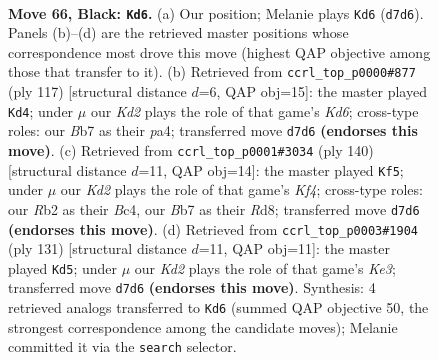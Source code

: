 \documentclass[11pt]{article}
\begin{document}
\clearpage

\begin{figure}[p]\centering
\begin{subfigure}{0.46\textwidth}\centering
\resizebox{\linewidth}{!}{%
\newchessgame
\chessboard[
  setfen={6R1/1b1k4/8/8/RP6/8/1r6/6K1 b - - 6 66},
  showmover=false,
  pgfstyle=straightmove, color=movearrow, markmove={d7-d6}
]}
\caption{}
\end{subfigure}\hfill
\begin{subfigure}{0.46\textwidth}\centering
\resizebox{\linewidth}{!}{%
\newchessgame
\chessboard[
  setfen={8/8/8/2R4P/P7/3k4/7r/2K5 b - - 30 59},
  showmover=false,
  pgfstyle=straightmove, color=movearrow, markmove={d3-d4}
]}
\caption{}
\end{subfigure}
\\[4pt]
\begin{subfigure}{0.46\textwidth}\centering
\resizebox{\linewidth}{!}{%
\newchessgame
\chessboard[
  setfen={3R4/4rpk1/8/8/2B2K2/8/8/8 w - - 7 71},
  showmover=false,
  pgfstyle=straightmove, color=movearrow, markmove={f4-f5}
]}
\caption{}
\end{subfigure}\hfill
\begin{subfigure}{0.46\textwidth}\centering
\resizebox{\linewidth}{!}{%
\newchessgame
\chessboard[
  setfen={8/8/4k3/4b3/1R5P/7r/2K5/8 b - - 11 66},
  showmover=false,
  pgfstyle=straightmove, color=movearrow, markmove={e6-d5}
]}
\caption{}
\end{subfigure}
\caption{\textbf{Move 66, Black: \texttt{Kd6}.} (a) Our position; Melanie plays \texttt{Kd6} (\texttt{d7d6}). Panels (b)--(d) are the retrieved master positions whose correspondence most drove this move (highest QAP objective among those that transfer to it). (b) Retrieved from \texttt{ccrl\_top\_p0000\#877} (ply 117) [structural distance $d$=6, QAP obj=15]: the master played \texttt{Kd4}; under $\mu$ our \emph{Kd2} plays the role of that game's \emph{Kd6}; cross-type roles: our \emph{B}b7 as their \emph{p}a4; transferred move \texttt{d7d6} \textbf{(endorses this move)}. (c) Retrieved from \texttt{ccrl\_top\_p0001\#3034} (ply 140) [structural distance $d$=11, QAP obj=14]: the master played \texttt{Kf5}; under $\mu$ our \emph{Kd2} plays the role of that game's \emph{Kf4}; cross-type roles: our \emph{R}b2 as their \emph{B}c4, our \emph{B}b7 as their \emph{R}d8; transferred move \texttt{d7d6} \textbf{(endorses this move)}. (d) Retrieved from \texttt{ccrl\_top\_p0003\#1904} (ply 131) [structural distance $d$=11, QAP obj=11]: the master played \texttt{Kd5}; under $\mu$ our \emph{Kd2} plays the role of that game's \emph{Ke3}; transferred move \texttt{d7d6} \textbf{(endorses this move)}. Synthesis: 4 retrieved analogs transferred to \texttt{Kd6} (summed QAP objective 50, the strongest correspondence among the candidate moves); Melanie committed it via the \texttt{search} selector.}
\label{fig:thought-m131}
\end{figure}
\end{document}
